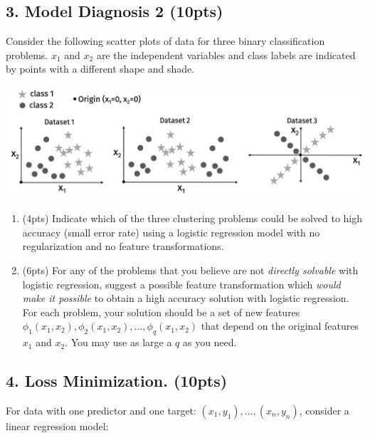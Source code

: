 \documentclass[10pt]{article}
\begin{document}
\newpage
\subsection{3. Model Diagnosis 2 (\textbf{\small 10pts})}
Consider the following scatter plots of data for three binary classification problems. $x_1$ and $x_2$ are the independent variables and class labels are indicated by points with a different shape and shade.

\includegraphics[width=\textwidth]{examp_datasets.png}



\begin{enumerate}[label=(\alph*)]
	\item (4pts) Indicate which of the three clustering problems could be solved to high accuracy (small error rate) using a logistic regression model with no regularization and no feature transformations. 
	\vspace{10em}
	
	\item (6pts) For any of the problems that you believe are not \emph{directly solvable} with logistic regression, suggest a possible feature transformation which \emph{would make it possible} to obtain a high accuracy solution with logistic regression. For each problem, your solution should be a set of new features $\phi_1(x_1,x_2), \phi_2(x_1,x_2), \ldots, \phi_q(x_1,x_2)$ that depend on the original features $x_1$ and $x_2$. You may use as large a $q$ as you need.
	\vspace{12em}


\end{enumerate}


\vspace{10em}

\newpage
\subsection{4. Loss Minimization. (\textbf{\small 10pts})}

For data with one predictor and one target: $(x_1, y_1), \ldots, (x_n, y_n)$, consider a linear regression model:
\end{document}
